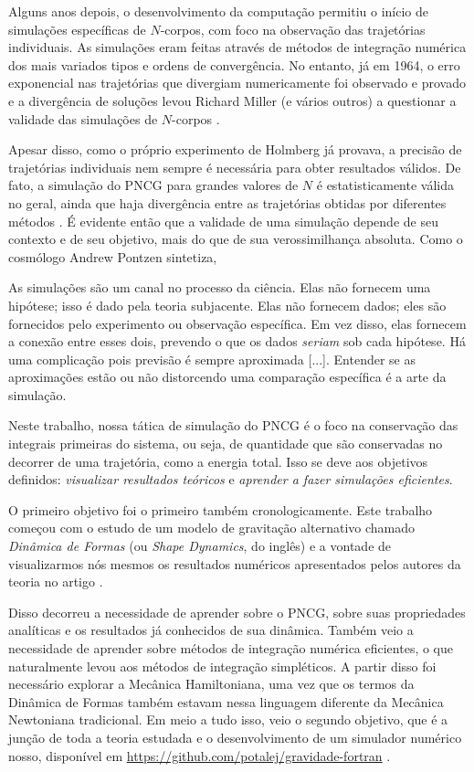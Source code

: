 Alguns anos depois, o desenvolvimento da computação permitiu o início de simulações específicas de $N$-corpos, com foco na observação das trajetórias individuais. As simulações eram feitas através de métodos de integração numérica dos mais variados tipos e ordens de convergência. No entanto, já em 1964, o erro exponencial nas trajetórias que divergiam numericamente foi observado e provado e a divergência de soluções levou Richard Miller (e vários outros) a questionar a validade das simulações de $N$-corpos \citep{Miller1964}.

Apesar disso, como o próprio experimento de Holmberg já provava, a precisão de trajetórias individuais nem sempre é necessária para obter resultados válidos. De fato, a simulação do PNCG para grandes valores de $N$ é estatisticamente válida no geral, ainda que haja divergência entre as trajetórias obtidas por diferentes métodos \citep{Boekholt2015}. É evidente então que a validade de uma simulação depende de seu contexto e de seu objetivo, mais do que de sua verossimilhança absoluta. Como o cosmólogo Andrew Pontzen sintetiza,
\begin{displayquote}
    As simulações são um canal no processo da ciência. Elas não fornecem uma hipótese; isso é dado pela teoria subjacente. Elas não fornecem dados; eles são fornecidos pelo experimento ou observação específica. Em vez disso, elas fornecem a conexão entre esses dois, prevendo o que os dados \textit{seriam} sob cada hipótese. Há uma complicação pois previsão é sempre aproximada [...]. Entender se as aproximações estão ou não distorcendo uma comparação específica é a arte da simulação. \citep[172]{Pontzen2023-ik}
\end{displayquote}

Neste trabalho, nossa tática de simulação do PNCG é o foco na conservação das integrais primeiras do sistema, ou seja, de quantidade que são conservadas no decorrer de uma trajetória, como a energia total. Isso se deve aos objetivos definidos: \textit{visualizar resultados teóricos} e \textit{aprender a fazer simulações eficientes}.

O primeiro objetivo foi o primeiro também cronologicamente. Este trabalho começou com o estudo de um modelo de gravitação alternativo chamado \textit{Dinâmica de Formas} (ou \textit{Shape Dynamics}, do inglês) e a vontade de visualizarmos nós mesmos os resultados numéricos apresentados pelos autores da teoria no artigo \cite{Barbour2014_identification}.

Disso decorreu a necessidade de aprender sobre o PNCG, sobre suas propriedades analíticas e os resultados já conhecidos de sua dinâmica. Também veio a necessidade de aprender sobre métodos de integração numérica eficientes, o que naturalmente levou aos métodos de integração simpléticos. A partir disso foi necessário explorar a Mecânica Hamiltoniana, uma vez que os termos da Dinâmica de Formas também estavam nessa linguagem diferente da Mecânica Newtoniana tradicional. Em meio a tudo isso, veio o segundo objetivo, que é a junção de toda a teoria estudada e o desenvolvimento de um simulador numérico nosso, disponível em \href{https://github.com/potalej/gravidade-fortran}{https://github.com/potalej/gravidade-fortran} \citep{potalej_gravidade-fortran}.

